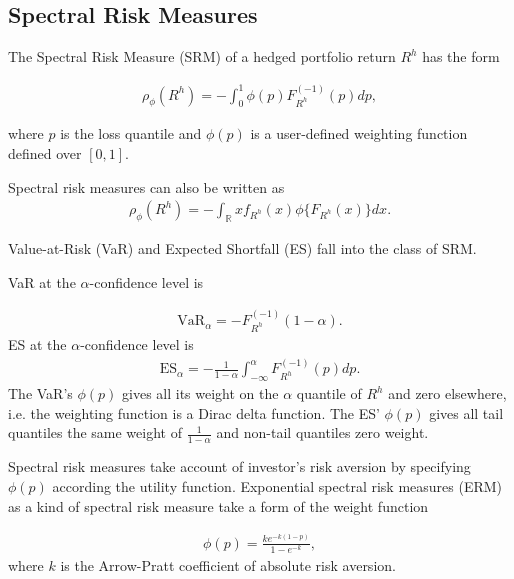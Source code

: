 \subsection{Spectral Risk Measures}\label{subsec:spectral-risk-measures}
The Spectral Risk Measure (SRM) of a hedged portfolio return $R^h$ has the form

\begin{align}
	\rho_\phi(R^h) = - \int_0^1 \phi(p) F_{R^h}^{(-1)}(p)d p,
	\end{align}

where $p$ is the loss quantile and $\phi(p)$ is a user-defined weighting function defined over $[0,1]$. \medskip


Spectral risk measures can also be written as
\begin{align}
	\rho_\phi(R^h) = - \int_\mathbb{R} x f_{R^h}(x) \phi\{F_{R^h}(x)\} d x.
	\end{align}

Value-at-Risk (VaR) and Expected Shortfall (ES) fall into the class of SRM. \medskip

VaR at the $\alpha$-confidence level is

\begin{align}
	\text{VaR}_\alpha = - F_{R^h}^{(-1)}(1-\alpha).
	\end{align}
ES at the $\alpha$-confidence level is 
\begin{align}
	\text{ES}_\alpha = -\frac{1}{1-\alpha}\int_{-\infty}^{\alpha} F_{R^h}^{(-1)}(p) d p.
	\end{align}
The VaR's $\phi(p)$ gives all its weight on the $\alpha$ quantile of $R^h$ and zero elsewhere,
i.e. the weighting function is a Dirac delta function.
The ES' $\phi(p)$ gives all tail quantiles the same weight of $\frac{1}{1-\alpha}$ and non-tail quantiles zero weight. \medskip

Spectral risk measures take account of investor's risk aversion by specifying $\phi(p)$ according the utility function.
Exponential spectral risk measures (ERM) as a kind of spectral risk measure take a form of the weight function

\begin{align}
	\phi(p) =\frac{k e^{-k(1-p)}}{1-e^{-k}} ,
	\end{align}
where $k$ is the Arrow-Pratt coefficient of absolute risk aversion. \medskip

